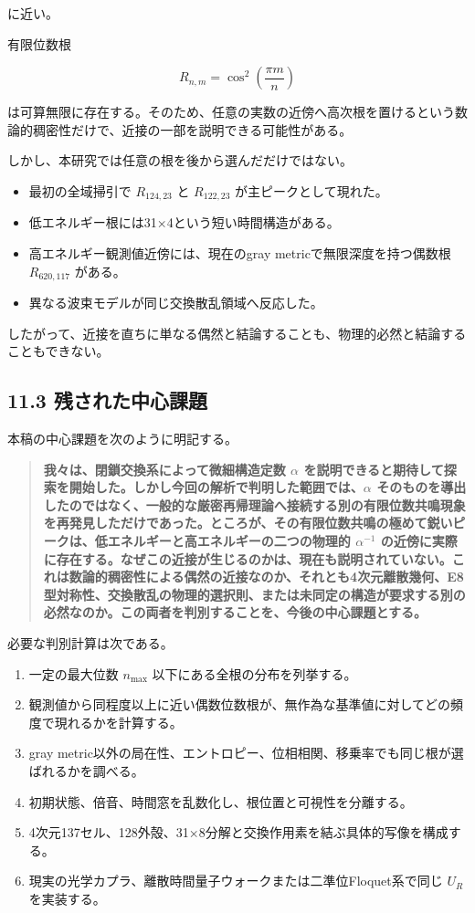\documentclass[
  10pt,
  a4paper,
]{article}
\providecommand{\tightlist}{%
  \setlength{\itemsep}{0pt}\setlength{\parskip}{0pt}}
\begin{document}
に近い。

有限位数根

\[
R_{n,m}=\cos^2\left(\frac{\pi m}{n}\right)
\]

は可算無限に存在する。そのため、任意の実数の近傍へ高次根を置けるという数論的稠密性だけで、近接の一部を説明できる可能性がある。

しかし、本研究では任意の根を後から選んだだけではない。

\begin{itemize}
\tightlist
\item
  最初の全域掃引で \(R_{124,23}\) と \(R_{122,23}\)
  が主ピークとして現れた。
\item
  低エネルギー根には31×4という短い時間構造がある。
\item
  高エネルギー観測値近傍には、現在のgray metricで無限深度を持つ偶数根
  \(R_{620,117}\) がある。
\item
  異なる波束モデルが同じ交換散乱領域へ反応した。
\end{itemize}

したがって、近接を直ちに単なる偶然と結論することも、物理的必然と結論することもできない。

\subsection{11.3
残された中心課題}\label{ux6b8bux3055ux308cux305fux4e2dux5fc3ux8ab2ux984c}

本稿の中心課題を次のように明記する。

\begin{quote}
\textbf{我々は、閉鎖交換系によって微細構造定数 \(\alpha\)
を説明できると期待して探索を開始した。しかし今回の解析で判明した範囲では、\(\alpha\)
そのものを導出したのではなく、一般的な厳密再帰理論へ接続する別の有限位数共鳴現象を再発見しただけであった。ところが、その有限位数共鳴の極めて鋭いピークは、低エネルギーと高エネルギーの二つの物理的
\(\alpha^{-1}\)
の近傍に実際に存在する。なぜこの近接が生じるのかは、現在も説明されていない。これは数論的稠密性による偶然の近接なのか、それとも4次元離散幾何、E8型対称性、交換散乱の物理的選択則、または未同定の構造が要求する別の必然なのか。この両者を判別することを、今後の中心課題とする。}
\end{quote}

必要な判別計算は次である。

\begin{enumerate}
\def\labelenumi{\arabic{enumi}.}
\tightlist
\item
  一定の最大位数 \(n_{\max}\) 以下にある全根の分布を列挙する。
\item
  観測値から同程度以上に近い偶数位数根が、無作為な基準値に対してどの頻度で現れるかを計算する。
\item
  gray
  metric以外の局在性、エントロピー、位相相関、移乗率でも同じ根が選ばれるかを調べる。
\item
  初期状態、倍音、時間窓を乱数化し、根位置と可視性を分離する。
\item
  4次元137セル、128外殻、31×8分解と交換作用素を結ぶ具体的写像を構成する。
\item
  現実の光学カプラ、離散時間量子ウォークまたは二準位Floquet系で同じ
  \(U_R\) を実装する。
\end{enumerate}
\end{document}

